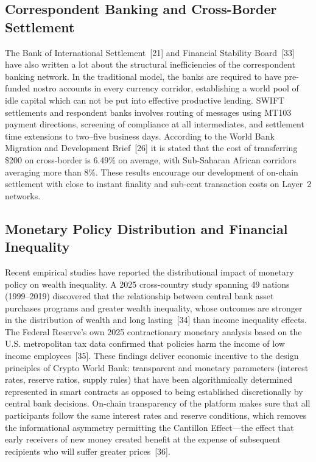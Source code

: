 \documentclass[12pt,a4paper]{report}
\begin{document}
\subsection{Correspondent Banking and Cross-Border Settlement}

The Bank of International Settlement~[21] and Financial Stability Board~[33] have also written a lot about the structural inefficiencies of the correspondent banking network. In the traditional model, the banks are required to have pre-funded nostro accounts in every currency corridor, establishing a world pool of idle capital which can not be put into effective productive lending. SWIFT settlements and respondent banks involves routing of messages using MT103 payment directions, screening of compliance at all intermediates, and settlement time extensions to two--five business days. According to the World Bank Migration and Development Brief~[26] it is stated that the cost of transferring \$200 on cross-border is 6.49\% on average, with Sub-Saharan African corridors averaging more than 8\%. These results encourage our development of on-chain settlement with close to instant finality and sub-cent transaction costs on Layer~2 networks.

\subsection{Monetary Policy Distribution and Financial Inequality}

Recent empirical studies have reported the distributional impact of monetary policy on wealth inequality. A 2025 cross-country study spanning 49 nations (1999--2019) discovered that the relationship between central bank asset purchases programs and greater wealth inequality, whose outcomes are stronger in the distribution of wealth and long lasting~[34] than income inequality effects. The Federal Reserve's own 2025 contractionary monetary analysis based on the U.S. metropolitan tax data confirmed that policies harm the income of low income employees~[35]. These findings deliver economic incentive to the design principles of Crypto World Bank: transparent and monetary parameters (interest rates, reserve ratios, supply rules) that have been algorithmically determined represented in smart contracts as opposed to being established discretionally by central bank decisions. On-chain transparency of the platform makes sure that all participants follow the same interest rates and reserve conditions, which removes the informational asymmetry permitting the Cantillon Effect---the effect that early receivers of new money created benefit at the expense of subsequent recipients who will suffer greater prices~[36].
\end{document}
